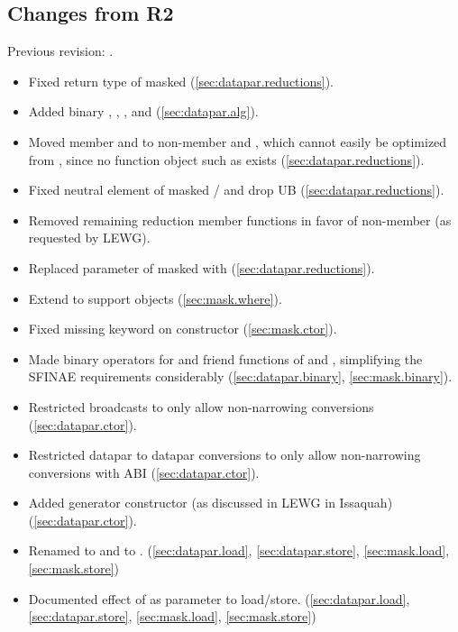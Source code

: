 \subsection{Changes from R2}
Previous revision: \citep{P0214R2}.
\begin{itemize}
    \item Fixed return type of masked  (\ref{sec:datapar.reductions}).
    \item Added binary , , , and  (\ref{sec:datapar.alg}).
    \item Moved member  and  to non-member  and , which cannot easily be optimized from , since no function object such as  exists (\ref{sec:datapar.reductions}).
    \item Fixed neutral element of masked / and drop UB (\ref{sec:datapar.reductions}).
    \item Removed remaining reduction member functions in favor of non-member  (as requested by LEWG).
    \item Replaced  parameter of masked  with  (\ref{sec:datapar.reductions}).
    \item Extend  to support \const \datapar objects (\ref{sec:mask.where}).
    \item Fixed missing  keyword on  constructor (\ref{sec:mask.ctor}).
    \item Made binary operators for \datapar and \mask friend functions of \datapar and \mask, simplifying the SFINAE requirements considerably (\ref{sec:datapar.binary}, \ref{sec:mask.binary}).
    \item Restricted broadcasts to only allow non-narrowing conversions (\ref{sec:datapar.ctor}).
    \item Restricted datapar to datapar conversions to only allow non-narrowing conversions with  ABI (\ref{sec:datapar.ctor}).
    \item Added generator constructor (as discussed in LEWG in Issaquah) (\ref{sec:datapar.ctor}).
    \item Renamed  to  and  to . (\ref{sec:datapar.load}, \ref{sec:datapar.store}, \ref{sec:mask.load}, \ref{sec:mask.store})
    \item Documented effect of  as  parameter to load/store. (\ref{sec:datapar.load}, \ref{sec:datapar.store}, \ref{sec:mask.load}, \ref{sec:mask.store})

\end{itemize}
